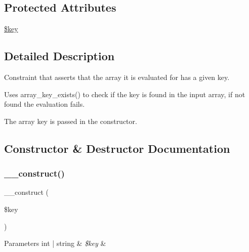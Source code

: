 \subsection*{Protected Attributes}
\begin{DoxyCompactItemize}
\item 
\mbox{\hyperlink{class_p_h_p_unit___framework___constraint___array_has_key_aa60b0284e0dfa2463495481cf11e3cf4}{\$key}}
\end{DoxyCompactItemize}


\subsection{Detailed Description}
Constraint that asserts that the array it is evaluated for has a given key.

Uses array\+\_\+key\+\_\+exists() to check if the key is found in the input array, if not found the evaluation fails.

The array key is passed in the constructor. 

\subsection{Constructor \& Destructor Documentation}
\mbox{\label{class_p_h_p_unit___framework___constraint___array_has_key_ae68e3281fdc4689e22a68b4b463c5fa9}} 
\subsubsection{\texorpdfstring{\+\_\+\+\_\+construct()}{\_\_construct()}}
{\footnotesize\ttfamily \+\_\+\+\_\+construct (\begin{DoxyParamCaption}\item[{}]{\$key }\end{DoxyParamCaption})}


\begin{DoxyParams}[1]{Parameters}
int | string & {\em \$key} & \\
\hline
\end{DoxyParams}


